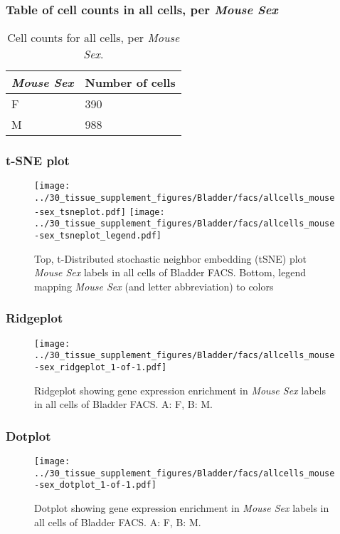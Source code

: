 \subsubsection{Table of cell counts in all cells, per \emph{Mouse Sex}}\begin{table}[h]
\centering
\label{my-label}
\begin{tabular}{@{}ll@{}}
\toprule

\emph{Mouse Sex}& Number of cells \\ \midrule
F & 390 \\

M & 988 \\
\bottomrule
\end{tabular}
\caption{Cell counts for all cells, per \emph{Mouse Sex}.}
\end{table}

\clearpage
\subsubsection{t-SNE plot}
\begin{figure}[h]
\centering
\texttt{[image: ../30\_tissue\_supplement\_figures/Bladder/facs/allcells\_mouse-sex\_tsneplot.pdf]}
\texttt{[image: ../30\_tissue\_supplement\_figures/Bladder/facs/allcells\_mouse-sex\_tsneplot\_legend.pdf]}
\caption{Top, t-Distributed stochastic neighbor embedding (tSNE) plot  \emph{Mouse Sex} labels in all cells of Bladder FACS. Bottom, legend mapping \emph{Mouse Sex} (and letter abbreviation) to colors}
\end{figure}


\clearpage

\subsubsection{Ridgeplot}
\begin{figure}[h]
\centering
\texttt{[image: ../30\_tissue\_supplement\_figures/Bladder/facs/allcells\_mouse-sex\_ridgeplot\_1-of-1.pdf]}

\caption{ Ridgeplot  showing gene expression enrichment in \emph{Mouse Sex} labels in all cells of Bladder FACS. A: F, B: M.}
\end{figure}


\clearpage

\subsubsection{Dotplot}
\begin{figure}[h]
\centering
\texttt{[image: ../30\_tissue\_supplement\_figures/Bladder/facs/allcells\_mouse-sex\_dotplot\_1-of-1.pdf]}

\caption{ Dotplot  showing gene expression enrichment in \emph{Mouse Sex} labels in all cells of Bladder FACS. A: F, B: M.}
\end{figure}

